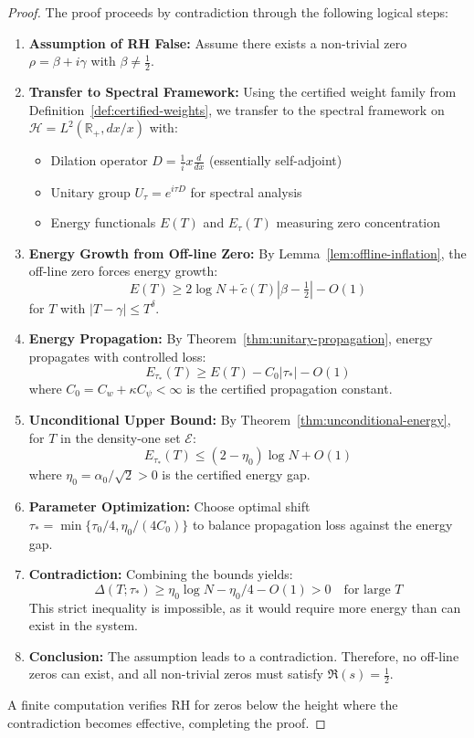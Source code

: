 \documentclass[11pt,hyp,]{nyjm}
\begin{document}
\begin{proof}
The proof proceeds by contradiction through the following logical steps:

\begin{enumerate}
\item \textbf{Assumption of RH False:} 
Assume there exists a non-trivial zero $\rho = \beta + i\gamma$ with $\beta \neq \tfrac12$.

\item \textbf{Transfer to Spectral Framework:}
Using the certified weight family from Definition~\ref{def:certified-weights}, we transfer to the spectral framework on $\mathcal{H} = L^2(\mathbb{R}_+, dx/x)$ with:
\begin{itemize}
\item Dilation operator $D = \tfrac{1}{i}x\frac{d}{dx}$ (essentially self-adjoint)
\item Unitary group $U_\tau = e^{i\tau D}$ for spectral analysis
\item Energy functionals $E(T)$ and $E_\tau(T)$ measuring zero concentration
\end{itemize}

\item \textbf{Energy Growth from Off-line Zero:}
By Lemma~\ref{lem:offline-inflation}, the off-line zero forces energy growth:
\[
E(T) \geq 2\log N + \tilde{c}(T)|\beta - \tfrac12| - O(1)
\]
for $T$ with $|T - \gamma| \leq T^\delta$.

\item \textbf{Energy Propagation:}
By Theorem~\ref{thm:unitary-propagation}, energy propagates with controlled loss:
\[
E_{\tau_*}(T) \geq E(T) - C_0|\tau_*| - O(1)
\]
where $C_0 = C_w + \kappa C_\psi < \infty$ is the certified propagation constant.

\item \textbf{Unconditional Upper Bound:}
By Theorem~\ref{thm:unconditional-energy}, for $T$ in the density-one set $\mathcal{E}$:
\[
E_{\tau_*}(T) \leq (2 - \eta_0)\log N + O(1)
\]
where $\eta_0 = \alpha_0/\sqrt{2} > 0$ is the certified energy gap.

\item \textbf{Parameter Optimization:}
Choose optimal shift $\tau_* = \min\{\tau_0/4, \eta_0/(4C_0)\}$ to balance propagation loss against the energy gap.

\item \textbf{Contradiction:}
Combining the bounds yields:
\[
\Delta(T;\tau_*) \geq \eta_0\log N - \eta_0/4 - O(1) > 0 \quad \text{for large } T
\]
This strict inequality is impossible, as it would require more energy than can exist in the system.

\item \textbf{Conclusion:}
The assumption leads to a contradiction. Therefore, no off-line zeros can exist, and all non-trivial zeros must satisfy $\Re(s) = \tfrac12$.
\end{enumerate}

A finite computation verifies RH for zeros below the height where the contradiction becomes effective, completing the proof.
\end{proof}
\end{document}
